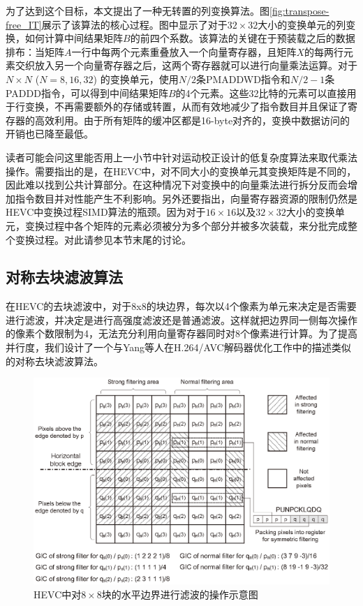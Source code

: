 为了达到这个目标，本文提出了一种无转置的列变换算法。图\ref{fig:transpose-free_IT}展示了该算法的核心过程。图中显示了对于$32 \times 32$大小的变换单元的列变换，如何计算中间结果矩阵$B$的前四个系数。该算法的关键在于预装载之后的数据排布：当矩阵$A$一行中每两个元素重叠放入一个向量寄存器，且矩阵$X$的每两行元素交织放入另一个向量寄存器之后，这两个寄存器就可以进行向量乘法运算。对于$N \times N$ ($N = 8, 16, 32$) 的变换单元，使用$N/2$条PMADDWD指令和$N/2 - 1$条PADDD指令，可以得到中间结果矩阵$B$的4个元素。这些32比特的元素可以直接用于行变换，不再需要额外的存储或转置，从而有效地减少了指令数目并且保证了寄存器的高效利用。由于所有矩阵的缓冲区都是16-byte对齐的，变换中数据访问的开销也已降至最低。

读者可能会问这里能否用上一小节中针对运动校正设计的低复杂度算法来取代乘法操作。需要指出的是，在HEVC中，对不同大小的变换单元其变换矩阵是不同的，因此难以找到公共计算部分。在这种情况下对变换中的向量乘法进行拆分反而会增加指令数目并对性能产生不利影响。另外还要指出，向量寄存器资源的限制仍然是HEVC中变换过程SIMD算法的瓶颈。因为对于$16 \times 16$以及$32 \times 32$大小的变换单元，变换过程中各个矩阵的元素必须被分为多个部分并被多次装载，来分批完成整个变换过程。对此请参见本节末尾的讨论。

\subsection{对称去块滤波算法}

在HEVC的去块滤波中，对于8x8的块边界，每次以4个像素为单元来决定是否需要进行滤波，并决定是进行高强度滤波还是普通滤波。这样就把边界同一侧每次操作的像素个数限制为4，无法充分利用向量寄存器同时对8个像素进行计算。为了提高并行度，我们设计了一个与Yang等人在H.264/AVC解码器优化工作\supercite{Yang-TCE2006}中的描述类似的对称去块滤波算法。

\begin{figure}[h]
	\centering
	\includegraphics[width = 1.0\linewidth]{eps/vertical_DF_to_horizontal_edge}
	\caption{\label{fig:vertical_DF_to_horizontal_edge}HEVC中对$8 \times 8$块的水平边界进行滤波的操作示意图}
\end{figure}

